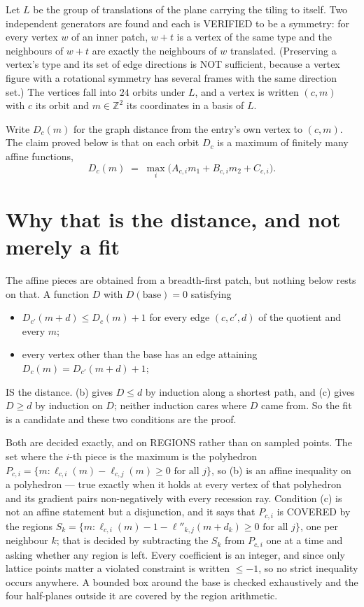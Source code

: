 \documentclass[11pt,a4paper]{article}
\theoremstyle{plain}
\theoremstyle{definition}
\begin{document}
Let $L$ be the group of translations of the plane carrying the tiling to itself. Two
independent generators are found and each is VERIFIED to be a symmetry: for every vertex $w$
of an inner patch, $w+t$ is a vertex of the same type and the neighbours of $w+t$ are exactly
the neighbours of $w$ translated. (Preserving a vertex's type and its set of edge directions
is NOT sufficient, because a vertex figure with a rotational symmetry has several frames with
the same direction set.) The vertices fall into $24$ orbits under $L$, and a vertex is
written $(c,m)$ with $c$ its orbit and $m\in\mathbb{Z}^2$ its coordinates in a basis of $L$.

Write $D_c(m)$ for the graph distance from the entry's own vertex to $(c,m)$. The claim proved
below is that on each orbit $D_c$ is a maximum of finitely many affine functions,
\[
D_c(m)\;=\;\max_i\bigl(A_{c,i}m_1+B_{c,i}m_2+C_{c,i}\bigr).
\]

\section{Why that is the distance, and not merely a fit}

The affine pieces are obtained from a breadth-first patch, but nothing below rests on that. A
function $D$ with $D(\text{base})=0$ satisfying

\begin{itemize}
\item[(b)] $D_{c'}(m+d)\le D_c(m)+1$ for every edge $(c,c',d)$ of the quotient and every $m$;
\item[(c)] every vertex other than the base has an edge attaining $D_c(m)=D_{c'}(m+d)+1$;
\end{itemize}

IS the distance. (b) gives $D\le d$ by induction along a shortest path, and (c) gives $D\ge d$
by induction on $D$; neither induction cares where $D$ came from. So the fit is a candidate and
these two conditions are the proof.

Both are decided exactly, and on REGIONS rather than on sampled points. The set where the
$i$-th piece is the maximum is the polyhedron
$P_{c,i}=\{m: \ell_{c,i}(m)-\ell_{c,j}(m)\ge0 \text{ for all } j\}$, so (b) is an
affine inequality on a polyhedron --- true exactly when it holds at every vertex of that
polyhedron and its gradient pairs non-negatively with every recession ray. Condition (c) is
not an affine statement but a disjunction, and it says that $P_{c,i}$ is COVERED by the
regions
$S_k=\{m:\ell_{c,i}(m)-1-\ell''_{k,j}(m+d_k)\ge0\text{ for all }j\}$, one per
neighbour $k$; that is decided by subtracting the $S_k$ from $P_{c,i}$ one at a time and
asking whether any region is left. Every coefficient is an integer, and since only lattice
points matter a violated constraint is written $\le-1$, so no strict inequality occurs
anywhere. A bounded box around the base is checked exhaustively and the four half-planes
outside it are covered by the region arithmetic.
\end{document}
